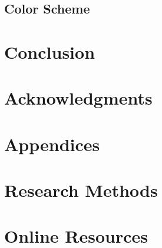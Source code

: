 \documentclass[sigconf]{acmart}
\begin{document}
\subsection{Color Scheme}
	
\section{Conclusion}
	\lipsum[2-2]

\section{Acknowledgments}
	\lipsum[2-2]\cite{Abril07}




\section*{Appendices}
\appendix

\section{Research Methods}
	\lipsum[2-2]

\section{Online Resources}
	\lipsum[2-2]
\end{document}

